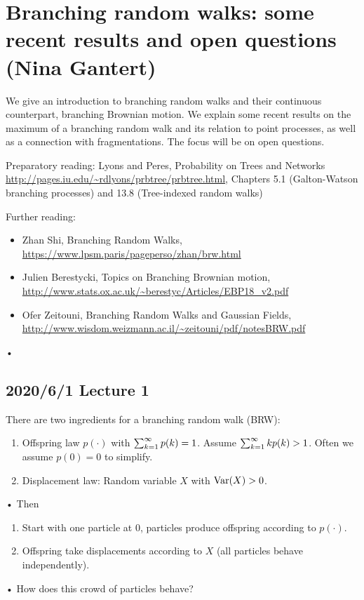 \section{Branching random walks: some recent results and open questions (Nina Gantert)}

 We give an introduction to branching random walks and their continuous counterpart, branching Brownian motion. We explain some recent results on the maximum of a branching random walk and its relation to point processes, as well as a connection with fragmentations. The focus will be on open questions.

Preparatory reading: Lyons and Peres, Probability on Trees and Networks \url{http://pages.iu.edu/~rdlyons/prbtree/prbtree.html}, Chapters 5.1 (Galton-Watson branching processes) and 13.8 (Tree-indexed random walks)

Further reading:
\begin{itemize}
\item
Zhan Shi, Branching Random Walks, \url{https://www.lpsm.paris/pageperso/zhan/brw.html}
\item
Julien Berestycki, Topics on Branching Brownian motion, \url{http://www.stats.ox.ac.uk/~berestyc/Articles/EBP18_v2.pdf}
\item
Ofer Zeitouni, Branching Random Walks and Gaussian Fields, \url{http://www.wisdom.weizmann.ac.il/~zeitouni/pdf/notesBRW.pdf}
\end{itemize}•

%

\subsection*{2020/6/1 Lecture 1}

There are two ingredients for a branching random walk (BRW):
\begin{enumerate}
\item
Offspring law $p(\cdot)$ with $\sum_{k=1}^{\infty} p(k)=1$. Assume $\sum_{k=1}^{\infty} kp(k)>1$. Often we assume $p(0)=0$ to simplify.
\item 
Displacement law: Random variable $X$ with $\operatorname{Var}(X)>0$. 
\end{enumerate}•
Then
\begin{enumerate}
\item
Start with one particle at 0, particles produce offspring according to $p(\cdot)$.
\item 
Offspring take displacements according to $X$ (all particles behave independently).
\end{enumerate}•
How does this crowd of particles behave?

